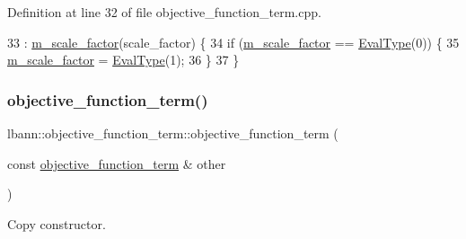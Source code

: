 Definition at line 32 of file objective\+\_\+function\+\_\+term.\+cpp.


\begin{DoxyCode}
33   : \hyperlink{classlbann_1_1objective__function__term_a59a544b8ff0455ed5091de3bf0d81c3c}{m\_scale\_factor}(scale\_factor) \{
34   \textcolor{keywordflow}{if} (\hyperlink{classlbann_1_1objective__function__term_a59a544b8ff0455ed5091de3bf0d81c3c}{m\_scale\_factor} == \hyperlink{base_8hpp_a3266f5ac18504bbadea983c109566867}{EvalType}(0)) \{
35     \hyperlink{classlbann_1_1objective__function__term_a59a544b8ff0455ed5091de3bf0d81c3c}{m\_scale\_factor} = \hyperlink{base_8hpp_a3266f5ac18504bbadea983c109566867}{EvalType}(1);
36   \}
37 \}
\end{DoxyCode}
\mbox{\label{classlbann_1_1objective__function__term_a791a33056717d8b3f5ca2288145d86c8}} 
\subsubsection{\texorpdfstring{objective\+\_\+function\+\_\+term()}{objective\_function\_term()}\hspace{0.1cm}{\footnotesize\ttfamily [2/2]}}
{\footnotesize\ttfamily lbann\+::objective\+\_\+function\+\_\+term\+::objective\+\_\+function\+\_\+term (\begin{DoxyParamCaption}\item[{const \hyperlink{classlbann_1_1objective__function__term}{objective\+\_\+function\+\_\+term} \&}]{other }\end{DoxyParamCaption})\hspace{0.3cm}{\ttfamily [default]}}

Copy constructor. \mbox{\label{classlbann_1_1objective__function__term_ad95920d424b3c248a2124827971451df}} 
